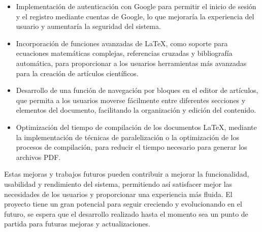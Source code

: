 \begin{itemize}
\item Implementación de autenticación con Google para permitir el inicio de sesión y el registro mediante cuentas de Google, lo que mejoraría la experiencia del usuario y aumentaría la seguridad del sistema.
\item Incorporación de funciones avanzadas de LaTeX, como soporte para ecuaciones matemáticas complejas, referencias cruzadas y bibliografía automática, para proporcionar a los usuarios herramientas más avanzadas para la creación de artículos científicos.
\item Desarrollo de una función de navegación por bloques en el editor de artículos, que permita a los usuarios moverse fácilmente entre diferentes secciones y elementos del documento, facilitando la organización y edición del contenido.
\item Optimización del tiempo de compilación de los documentos LaTeX, mediante la implementación de técnicas de paralelización o la optimización de los procesos de compilación, para reducir el tiempo necesario para generar los archivos PDF.
\end{itemize}

Estas mejoras y trabajos futuros pueden contribuir a mejorar la funcionalidad, usabilidad y rendimiento del sistema, permitiendo así satisfacer mejor las necesidades de los usuarios y proporcionar una experiencia más fluida. El proyecto tiene un gran potencial para seguir creciendo y evolucionando en el futuro, se espera que el desarrollo realizado hasta el momento sea un punto de partida para futuras mejoras y actualizaciones.



